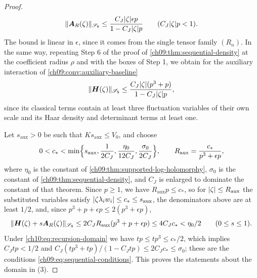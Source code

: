 \begin{proof}
\begin{equation}\label{ch10:eq:inserted-supported-bound}
 \lVert \boldsymbol A_R(\zeta)\rVert_{\mathscr S_8}\le\frac{C_J\lvert \zeta\rvert\epsilon p}{1-C_J\lvert \zeta\rvert p}\qquad(C_J\lvert \zeta\rvert p<1).
\end{equation}
The bound is linear in $\epsilon$, since it comes from the single tensor family $(R_n)$. In the same way, repeating Step 6 of the proof of \cref{ch09:thm:sequential-density} at the coefficient radius $\rho$ and with the boxes of Step 1, we obtain for the auxiliary interaction of \cref{ch09:conv:auxiliary-baseline}
\[
 \lVert \boldsymbol H(\zeta)\rVert_{\mathscr S_8}\le\frac{C_J\lvert \zeta\rvert(p^3+p)}{1-C_J\lvert \zeta\rvert p},
\]
since its classical terms contain at least three fluctuation variables of their own scale and its Haar density and determinant terms at least one.

Let $s_{\mathrm{aux}}>0$ be such that $Ks_{\mathrm{aux}}\le V_0$, and choose
\begin{equation}\label{ch10:eq:marked-disc}
 0<c_*<\min\Bigl\{s_{\mathrm{aux}},\frac1{2C_J},\frac{\eta_0}{12C_J},\frac{\sigma_0}{2C_J}\Bigr\},\qquad R_{\mathrm{aux}}=\frac{c_*}{p^3+\epsilon p},
\end{equation}
where $\eta_0$ is the constant of \cref{ch09:thm:supported-log-holomorphy}, $\sigma_0$ is the constant of \cref{ch09:thm:sequential-density}, and $C_J$ is enlarged to dominate the constant of that theorem. Since $p\ge1$, we have $R_{\mathrm{aux}}p\le c_*$, so for $\lvert \zeta\rvert\le R_{\mathrm{aux}}$ the substituted variables satisfy $\lvert \zeta\lambda_iw_i\rvert\le c_*\le s_{\mathrm{aux}}$, the denominators above are at least $1/2$, and, since $p^3+p+\epsilon p\le2(p^3+\epsilon p)$,
\[
 \lVert \boldsymbol H(\zeta)+s\boldsymbol A_R(\zeta)\rVert_{\mathscr S_8}\le2C_JR_{\mathrm{aux}}(p^3+p+\epsilon p)\le4C_Jc_*<\eta_0/2\qquad(0\le s\le1).
\]
Under \eqref{ch10:eq:recursion-domain} we have $tp\le tp^3\le c_*/2$, which implies $C_Jtp<1/2$ and $C_J(tp^3+tp)/(1-C_Jtp)\le2C_Jc_*\le\sigma_0$; these are the conditions \eqref{ch09:eq:sequential-conditions}. This proves the statements about the domain in (3).


\end{proof}
